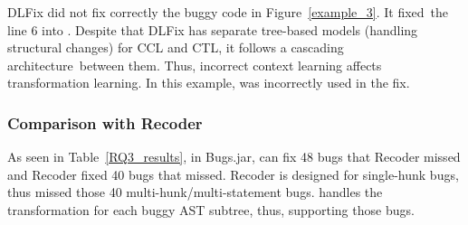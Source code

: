 DLFix did not fix correctly the buggy code in
Figure~\ref{example_3}. It fixed~the line 6 into    \code{\%}
. Despite that DLFix has separate tree-based models
(handling structural changes) for CCL and CTL,
it follows a cascading architecture~between them.
Thus, incorrect context learning affects transformation
learning. In this example,  was incorrectly used in the
fix.














\subsubsection{\bf Comparison with Recoder}

As seen in Table~\ref{RQ3_results}, in Bugs.jar, {\tool} can fix 48
bugs that Recoder missed and Recoder fixed 40 bugs that {\tool}
missed. Recoder is designed for single-hunk bugs, thus missed
those 40 multi-hunk/multi-statement bugs. {\tool} handles
the transformation for each buggy AST subtree, thus, supporting
those bugs.
